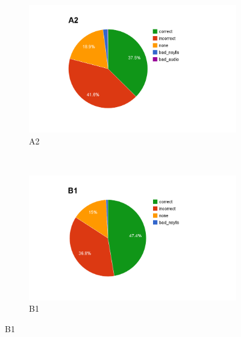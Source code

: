 		
			\begin{figure}[htb]
				\centering
				\begin{subfigure}[t]{0.5\textwidth}
					\includegraphics[width=\textwidth]{img/annotation/A2}
					\caption{A2}
					\label{fig:levelpies:A2}
				\end{subfigure}%
				~
				\begin{subfigure}[t]{0.5\textwidth}
					\includegraphics[width=\textwidth]{img/annotation/B1}
					\caption{B1}
					\label{fig:levelpies:B1}
				\end{subfigure}%
				

\end{figure}

